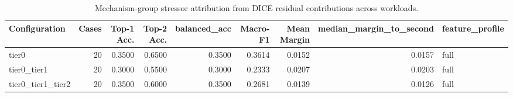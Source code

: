 \begin{table}[t]
\centering
\caption{Mechanism-group stressor attribution from DICE residual contributions across workloads.}
\label{tab:dice_stressor_diagnosis}
\footnotesize
\begin{tabular}{lrrrrrrrl}
\toprule
Configuration & Cases & Top-1 Acc. & Top-2 Acc. & balanced_acc & Macro-F1 & Mean Margin & median_margin_to_second & feature_profile \\
\midrule
tier0 & 20 & 0.3500 & 0.6500 & 0.3500 & 0.3614 & 0.0152 & 0.0157 & full \\
tier0_tier1 & 20 & 0.3000 & 0.5500 & 0.3000 & 0.2333 & 0.0207 & 0.0203 & full \\
tier0_tier1_tier2 & 20 & 0.3500 & 0.6000 & 0.3500 & 0.2681 & 0.0139 & 0.0126 & full \\
\bottomrule
\end{tabular}

\end{table}
